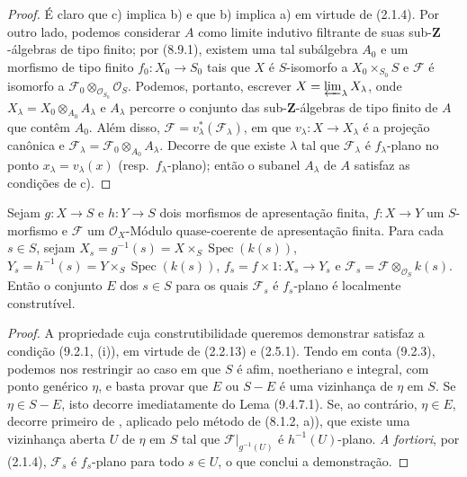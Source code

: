 \begin{proof}
É claro que c) implica b) e que b) implica a) em virtude de (2.1.4). Por outro lado, podemos considerar $A$ como limite indutivo filtrante de suas sub-$\mathbf Z$-álgebras de tipo finito; por (8.9.1), existem uma tal subálgebra $A_0$ e um morfismo de tipo finito $f_0:X_0\to S_0$ tais que $X$ é $S$-isomorfo a $X_0\times_{S_0}S$ e $\mathcal F$ é isomorfo a $\mathcal F_0\otimes_{\mathcal O_{S_0}}\mathcal O_S$. Podemos, portanto, escrever $X=\varprojlim_\lambda X_\lambda$, onde $X_\lambda=X_0\otimes_{A_0}A_\lambda$ e $A_\lambda$ percorre o conjunto das sub-$\mathbf Z$-álgebras de tipo finito de $A$ que contêm $A_0$. Além disso, $\mathcal F=v_\lambda^*(\mathcal F_\lambda)$, em que $v_\lambda:X\to X_\lambda$ é a projeção canônica e $\mathcal F_\lambda=\mathcal F_0\otimes_{A_0}A_\lambda$. Decorre de  que existe $\lambda$ tal que $\mathcal F_\lambda$ é $f_\lambda$-plano no ponto $x_\lambda=v_\lambda(x)$ (resp.\ $f_\lambda$-plano); então o subanel $A_\lambda$ de $A$ satisfaz as condições de c).
\end{proof}

\begin{proposition}[11.2.8]
\label{IV.11.2.8}
Sejam $g:X\to S$ e $h:Y\to S$ dois morfismos de apresentação finita, $f:X\to Y$ um $S$-morfismo e $\mathcal F$ um $\mathcal O_X$-Módulo quase-coerente de apresentação finita. Para cada $s\in S$, sejam $X_s=g^{-1}(s)=X\times_S\operatorname{Spec}(k(s))$, $Y_s=h^{-1}(s)=Y\times_S\operatorname{Spec}(k(s))$, $f_s=f\times1:X_s\to Y_s$ e $\mathcal F_s=\mathcal F\otimes_{\mathcal O_S}k(s)$. Então o conjunto $E$ dos $s\in S$ para os quais $\mathcal F_s$ é $f_s$-plano é localmente construtível.
\end{proposition}

\begin{proof}
A propriedade cuja construtibilidade queremos demonstrar satisfaz a condição (9.2.1, (i)), em virtude de (2.2.13) e (2.5.1). Tendo em conta (9.2.3), podemos nos restringir ao caso em que $S$ é afim, noetheriano e integral, com ponto genérico $\eta$, e basta provar que $E$ ou $S-E$ é uma vizinhança de $\eta$ em $S$. Se $\eta\in S-E$, isto decorre imediatamente do Lema (9.4.7.1). Se, ao contrário, $\eta\in E$, decorre primeiro de , aplicado pelo método de (8.1.2, a)), que existe uma vizinhança aberta $U$ de $\eta$ em $S$ tal que $\mathcal F|_{g^{-1}(U)}$ é $h^{-1}(U)$-plano. \emph{A fortiori}, por (2.1.4), $\mathcal F_s$ é $f_s$-plano para todo $s\in U$, o que conclui a demonstração.
\end{proof}

